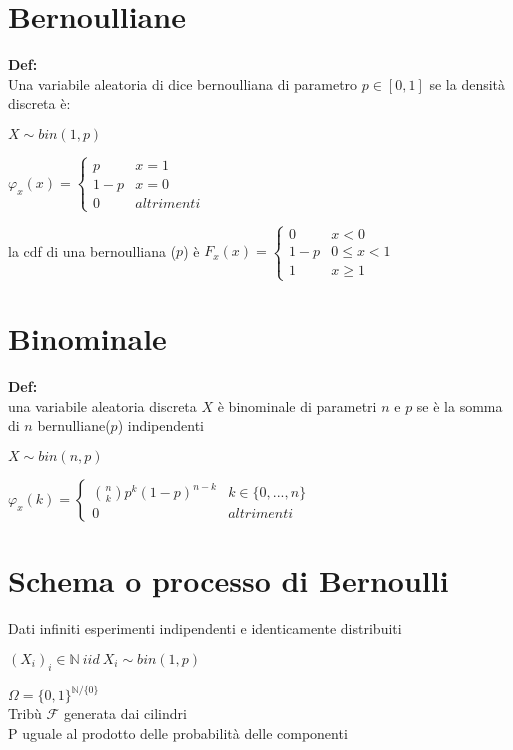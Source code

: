 \documentclass[12pt, a4paper]{article}
\begin{document}
\section{Bernoulliane}
\textbf{Def:}\\ Una variabile aleatoria di dice bernoulliana di parametro $p\in[0,1]$ se la densità discreta è:
\begin{center}
    $X\sim bin(1,p)$

    $\varphi_{x}(x)=\begin{cases}            
        p & x=1\\
        1-p & x=0\\
        0 & altrimenti
        
    \end{cases}$
\end{center}
la cdf di una bernoulliana ($p$) è 
$F_{x}(x)=
\begin{cases}
        0 & x < 0\\
        1-p & 0 \leq x<1\\
        1 & x\geq 1
\end{cases}$

\section{Binominale}
\textbf{Def:}\\ una variabile aleatoria discreta $X$ è binominale di parametri $n$ e $p$ se è la somma di $n$ bernulliane($p$) 
indipendenti
\begin{center}
    $X\sim bin(n,p)$

    $\varphi_{x}(k)=
    \begin{cases}
            \binom{n}{k}p^{k}(1-p)^{n-k} & k\in\{0,...,n\}\\
            0 & altrimenti
        
    \end{cases}$
\end{center}

\newpage
\section{Schema o processo di Bernoulli}

Dati infiniti esperimenti indipendenti e identicamente distribuiti
\begin{center}
    $(X_{i})_{i}\in\mathbb{N}\ iid\ X_{i}\sim bin(1,p)$
\end{center}
$\Omega=\{0,1\}^{\mathbb{N}/\{0\}}$\\
Tribù $\mathcal{F}$ generata dai cilindri\\
P uguale al prodotto delle probabilità delle componenti
\end{document}
